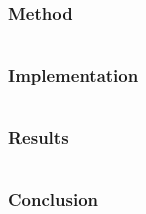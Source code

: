 \documentclass{beamer}
\begin{document}
\begin{frame}
\frametitle{Method}
\end{frame}


\section[Implementation]{}


\begin{frame}
\frametitle{Implementation}
\end{frame}


\section[Results]{}


\begin{frame}
\frametitle{Results}
\end{frame}


\section[Conclusion]{}


\begin{frame}
\frametitle{Conclusion}
\end{frame}
\end{document}
